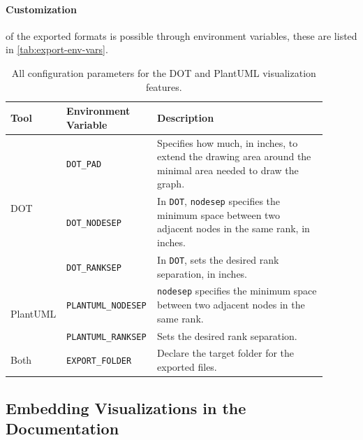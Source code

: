 \paragraph{Customization} of the exported formats is possible through environment variables,
these are listed in \autoref{tab:export-env-vars}.

\begin{table}[]
    \centering
    \begin{tabular}{p{0.12\linewidth}|p{0.25\linewidth}|p{0.53\linewidth}}
        Tool                      & Environment Variable       & Description                                                                                                           \\ \hline
        \multirow{3}{*}{DOT}      & \texttt{DOT\_PAD}          & Specifies how much, in inches, to extend the drawing area around the minimal area needed to draw the graph.           \\ \cline{2-3}
                                  & \texttt{DOT\_NODESEP}      & In \texttt{DOT}, \texttt{nodesep} specifies the minimum space between two adjacent nodes in the same rank, in inches. \\ \cline{2-3}
                                  & \texttt{DOT\_RANKSEP}      & In \texttt{DOT}, sets the desired rank separation, in inches.                                                         \\ \hline
        \multirow{2}{*}{PlantUML} & \texttt{PLANTUML\_NODESEP} & \texttt{nodesep} specifies the minimum space between two adjacent nodes in the same rank.                             \\ \cline{2-3}
                                  & \texttt{PLANTUML\_RANKSEP} & Sets the desired rank separation.                                                                                     \\ \hline
        Both                      & \texttt{EXPORT\_FOLDER}    & Declare the target folder for the exported files.
    \end{tabular}
    \caption{All configuration parameters for the DOT and PlantUML visualization features.}
    \label{tab:export-env-vars}
\end{table}

\subsection{Embedding Visualizations in the Documentation}\label{sec:automata-visualization:documentation-generation}

